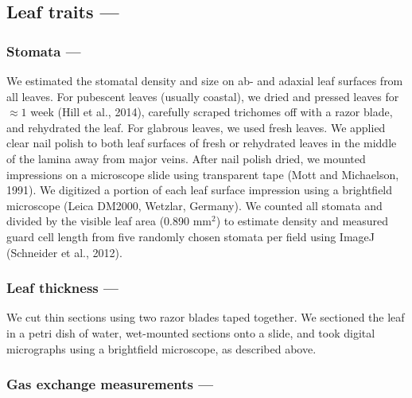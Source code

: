 \documentclass[
  letterpaper,
  DIV=11,
  numbers=noendperiod]{scrartcl}
\begin{document}
\hypertarget{leaf-traits}{%
\subsection{Leaf traits ---}\label{leaf-traits}}

\hypertarget{stomata}{%
\subsubsection{Stomata ---}\label{stomata}}

We estimated the stomatal density and size on ab- and adaxial leaf
surfaces from all leaves. For pubescent leaves (usually coastal), we
dried and pressed leaves for \(\approx 1\) week (Hill et al., 2014),
carefully scraped trichomes off with a razor blade, and rehydrated the
leaf. For glabrous leaves, we used fresh leaves. We applied clear nail
polish to both leaf surfaces of fresh or rehydrated leaves in the middle
of the lamina away from major veins. After nail polish dried, we mounted
impressions on a microscope slide using transparent tape (Mott and
Michaelson, 1991). We digitized a portion of each leaf surface
impression using a brightfield microscope (Leica DM2000, Wetzlar,
Germany). We counted all stomata and divided by the visible leaf area
(0.890 mm\(^2\)) to estimate density and measured guard cell length from
five randomly chosen stomata per field using ImageJ (Schneider et al.,
2012).

\hypertarget{leaf-thickness}{%
\subsubsection{Leaf thickness ---}\label{leaf-thickness}}

We cut thin sections using two razor blades taped together. We sectioned
the leaf in a petri dish of water, wet-mounted sections onto a slide,
and took digital micrographs using a brightfield microscope, as
described above.

\hypertarget{gas-exchange-measurements}{%
\subsubsection{Gas exchange measurements
---}\label{gas-exchange-measurements}}
\end{document}
